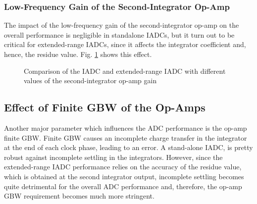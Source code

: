 \subsubsection{Low-Frequency Gain of the Second-Integrator Op-Amp}
The impact of the low-frequency gain of the second-integrator op-amp on the overall performance is negligible in standalone IADCs, but it turn out to be critical for extended-range IADCs, since it affects the integrator coefficient and, hence, the residue value. Fig. \ref{SNR_G2} shows this effect.
\begin{figure}
\centering
{}
\hfil
{}
\caption{Comparison of the IADC and extended-range IADC with different values of the second-integrator op-amp gain}
\label{SNR_G2}
\end{figure}

\subsection{Effect of Finite GBW of the Op-Amps}
Another major parameter which influences the ADC performance is the op-amp finite GBW. Finite GBW causes an incomplete charge transfer in the integrator at the end of each clock phase, leading to an error. A stand-alone IADC, is pretty robust against incomplete settling in the integrators. However, since the extended-range IADC performance relies on the accuracy of the residue value, which is obtained at the second integrator output, incomplete settling becomes quite detrimental for the overall ADC performance and, therefore, the op-amp GBW requirement becomes much more stringent. 
